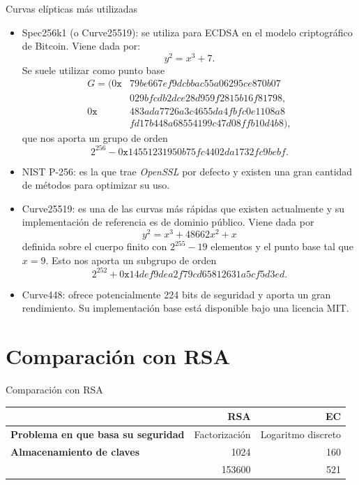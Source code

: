 \documentclass[12pt]{beamer}
\begin{document}
\begin{frame}[fragile, allowframebreaks=0.8]{Curvas elípticas más utilizadas}
  \begin{itemize}
\item Spec256k1 (o Curve25519): se utiliza para ECDSA en el modelo criptográfico de Bitcoin. Viene dada por:
\[
y^2 = x^3 + 7.
\]
Se suele utilizar como punto base
\begin{align*}
G = (0\texttt{x}&79be667ef9dcbbac55a06295ce870b07 \\
				&029bfcdb2dce28d959f2815b16f81798, \\
	 0\texttt{x}&483ada7726a3c4655da4fbfc0e1108a8 \\
	 			&fd17b448a68554199c47d08ffb10d4b8),
\end{align*}
que nos aporta un grupo de orden
\[
2^{256}-0\texttt{x}14551231950b75fc4402da1732fc9bebf.
\]

\item NIST P-256: es la que trae \textit{OpenSSL} por defecto y existen una gran cantidad de métodos para optimizar su uso. \\

\item Curve25519: es una de las curvas más rápidas que existen actualmente y su implementación de referencia es de dominio público. Viene dada por
\[
y^2 = x^3 + 48662x^2 + x
\]
definida sobre el cuerpo finito con $ 2^{255} - 19 $ elementos y el punto base tal que $ x = 9 $. Esto nos aporta un subgrupo de orden 
\[  2^{252 }+ 0\texttt{x}14def9dea2f79cd65812631a5cf5d3ed. \]

\item  Curve448: ofrece potencialmente 224 bits de seguridad y aporta un gran rendimiento. Su implementación base está disponible bajo una licencia MIT. \\
\end{itemize}

\end{frame}

\section{Comparación con RSA}\label{rsa}
\begin{frame}[fragile]{Comparación con RSA}
  \begin{table}[H]
	  \centering
	  \begin{adjustbox}{width=\textwidth}
	\begin{tabular}{lrr}
	  \toprule
	   & \textbf{RSA} & \textbf{EC} \\
	  \midrule
	  \textbf{Problema en que basa su seguridad} & Factorización & Logaritmo discreto\\
	  \textbf{Almacenamiento de claves} & 1024 & 160\\
           & 153600 & 521 \\
	  \bottomrule
	\end{tabular}
	\end{adjustbox}
	\end{table}
\end{frame}
\end{document}
